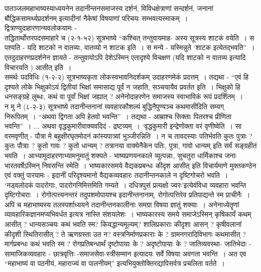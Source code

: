 {पातञ्जलमहाभाष्यस्याध्ययनेन तदानीन्तनसमाजस्य दर्शनं, विविधक्षेत्राणां सन्दर्शनं, जनानां बौद्धिकसामर्थ्यप्रदर्शनम् इत्यादीनां नैकेषां विषयाणां परिचयः सम्भवत्यस्माकम्~। द्वित्राण्युदाहारणान्यवलोकयामः -
~\\[0.1cm]
तद्धितार्थोत्तरपदसमाहारे च (२-१-५२) सूत्रभाष्ये “कश्चित् तन्तुवायमाह- अस्य सूत्रस्य शाटकं वयेति~। स पश्यति - यदि शाटको न वातव्यः, वातव्यो न शाटक इति~। स मन्ये - यस्मिन्नुते ‘शाटक इत्येतद्भवति”~। एतदुदाहरणप्रदर्शनेन ज्ञायते - तन्तुवायोऽपि देशेऽस्मिन् एतादृश्ये विचक्षण (यदि शाटको न वातव्य इत्यादि विचारयति ) आसीत् इति~। 
~\\[0.1cm]
समर्थः पदविधिः (१-२-२) सूत्रभाष्यकृता लोकस्वभावनिदर्शकम् उदाहरणमेकं प्रदत्तम्~। तद्यथा - “एवं हि दृश्यते लोके भिक्षुकोऽयं द्वितीयां भिक्षां समासाद्य पूर्वं न जहाति, सञ्चयायैव प्रवर्तत इति~। भिक्षुको हि धनसङ्ग्रहे लुब्धः, कथं वा पूर्वां भिक्षां जह्यात् ? अनेनोदाहरणेन समाजस्य स्वाभाविकं रूपं प्रदर्शितम्~। 
~\\[0.1cm]
न मु ने (८-२-३) सूत्रभाष्ये तदानीन्तनानां व्यवहारकौशल्यं बुद्धिनैपुण्यञ्च कथमा\-सीदिति सम्यग् निरूपितम्~। “अथवा द्विगता अपि हेतवो भवन्ति”~। तद्यथा - आम्राश्च सिक्ताः पितरश्च प्रीणिता भवन्ति”~। ... अथवा वृद्धकुमारीवाक्यवदिदं - द्रष्टव्यम्~। ‘वृद्धकुमारी इन्द्रेणोक्ता वरं वृणीष्वेति~। सा वरमवृणीत् - पौत्रा मे बहुक्षीरघृतमोदनं कांस्यपात्र्यां भुञ्जीरन्निति~। न च तावदस्याः पतिर्भवति कुतः पुत्राः ? कुतः पौत्राः ? कुतो गावः ? कुतो धान्यम् ?  तत्रानया वाक्येनैकेन पतिः, पुत्रा, गावो धान्यम् इति सर्वं सङ्ग्रहीतं भवति~। आभ्यामुदाहरणाभ्यामनुमातुं शक्यते - भाष्यप्रणयनकाले व्युत्पन्नाः, सुचतुरा धार्मिकाश्च जनाः भारतवर्षेऽस्मिन् निवसन्ति स्मेति~। भाष्यकारसमये वैद्यकप्रबन्धः कीदृश आसीत् इति विचार्यमाणे मुक्तकण्ठेन एवं वक्तुं पारयामः - इदानीं परिदृश्यमानो वैद्यकव्यवहारः तदानीन्तनकाले न दृष्टिगोचरो भवति~। ‘नड्वलोदकं पादरोगाः, पादरोगनिमित्तमिति गम्यते~। दधित्रपुसं प्रत्यक्षो ज्वरः’\break इत्येवंविधा व्यवहारा भवन्ति दृष्टिगोचराः~। रोगोत्पत्त्यनन्तरं तदुपशमोपायश्च इदानीन्तनानाम्, रोगोत्पत्तिरेव प्रतिपाद्यन्ते स्म प्राचीनैः~। 
~\\[0.2cm]
अपि च महाभाष्यस्य तलस्पर्शाध्ययने तदानीन्तनकालीनाः समग्रा विषया ज्ञातुं शक्याः~। अनेनाध्येतॄणां व्यावहारिकज्ञानमप्यभिवर्धत इत्यत्र नास्ति संशयलेशः~। भाष्यकारस्य \hbox{समये} समाजेऽस्मिन् कृषिकार्यं कथम् आसीत् ? धान्यसञ्चयः कथं भवति स्म? कियद्धान्यमूल्यम्? शालिप्रकाराः कीदृशा आसन् ? कृषीवलानां कीदृशी स्थितिरासीत् ? ते ऋणग्रस्ता उत न? वस्त्रनिर्माणप्रकाराः के ? ग्रामनगरादिविभागः कथमासीत् ? मार्गप्रबन्धः कथं \hbox{भवति} स्म ? रोगप्रतिबन्धार्थं दृष्टोपायाः के ? अदृष्टोपायाः के ? जातिव्यवस्था- जातिभेदाः - सामाजिकव्यवहारः - छात्रवृत्तिः -समाजसेवा-स्त्रीसम्मान इत्यादयः सर्वे विषया अवगता \hbox{भवन्ति~।} अत एव “महाभाष्यं वा पठनीयं, महाराज्यं वा पालनीयम्” इत्यभियुक्तोक्तिरद्यापि\break सर्वत्र प्रचलिता वर्तते~। 
~\\[-0.75cm]
}

